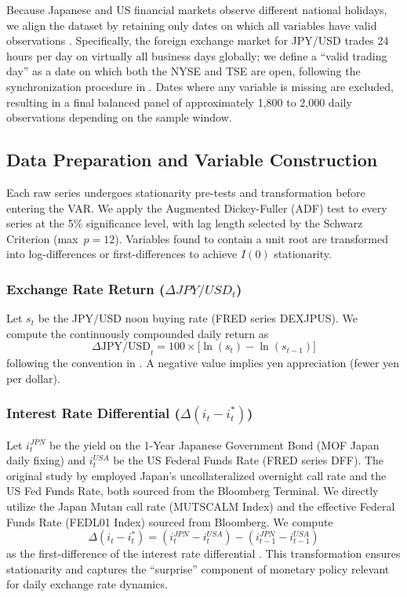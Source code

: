 \documentclass[12pt]{article}
\begin{document}
{} Because Japanese and US financial markets observe different national holidays, we align the dataset by retaining only dates on which all variables have valid observations \parencite{guyot2026risk}. Specifically, the foreign exchange market for JPY/USD trades 24 hours per day on virtually all business days globally; we define a \textquotedblleft valid trading day\textquotedblright{} as a date on which both the NYSE and TSE are open, following the synchronization procedure in \textcite[p.~11]{guyot2026risk}. Dates where any variable is missing are excluded, resulting in a final balanced panel of approximately 1,800 to 2,000 daily observations depending on the sample window.

\subsection{Data Preparation and Variable Construction}

{} Each raw series undergoes stationarity pre-tests and transformation before entering the VAR. We apply the Augmented Dickey-Fuller (ADF) test to every series at the 5\% significance level, with lag length selected by the Schwarz Criterion (max~$p=12$). Variables found to contain a unit root are transformed into log-differences or first-differences to achieve $I(0)$ stationarity.

\subsubsection{Exchange Rate Return ($\Delta JPY/USD_t$)}
{} Let $s_t$ be the JPY/USD noon buying rate (FRED series DEXJPUS). We compute the continuously compounded daily return as \begin{equation} \Delta \text{JPY/USD}_t = 100 \times \big[ \ln(s_t) - \ln(s_{t-1}) \big] \end{equation} following the convention in \textcite{guyot2026risk}. A negative value implies yen appreciation (fewer yen per dollar).

\subsubsection{Interest Rate Differential ($\Delta(i_t - i_t^*)$)}
{} Let $i_t^{JPN}$ be the yield on the 1-Year Japanese Government Bond (MOF Japan daily fixing) and $i_t^{USA}$ be the US Federal Funds Rate (FRED series DFF). The original study by \textcite{guyot2026risk} employed Japan's uncollateralized overnight call rate and the US Fed Funds Rate, both sourced from the Bloomberg Terminal. We directly utilize the Japan Mutan call rate (MUTSCALM Index) and the effective Federal Funds Rate (FEDL01 Index) sourced from Bloomberg. We compute \begin{equation} \Delta(i_t - i_t^*) = (i_t^{JPN} - i_t^{USA}) - (i_{t-1}^{JPN} - i_{t-1}^{USA}) \end{equation} as the first-difference of the interest rate differential \parencite{masujima2024drivers}. This transformation ensures stationarity and captures the \textquotedblleft surprise\textquotedblright{} component of monetary policy relevant for daily exchange rate dynamics.
\end{document}
